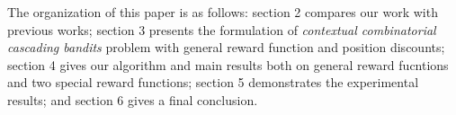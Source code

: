 \documentclass{article}
\newcommand{\wei}[1]{}
\newcommand{\wei}[1]{{\color{blue!50!black}  [\text{Wei:} #1]}}
\begin{document}




The organization of this paper is as follows: section 2 compares our work with previous works; section 3 presents the formulation of {\it contextual combinatorial cascading bandits} problem with general reward function and position discounts; section 4 gives our algorithm and main results both on general reward fucntions and two special reward functions; section 5 demonstrates the experimental results; and section 6 gives a final conclusion.

\end{document}
